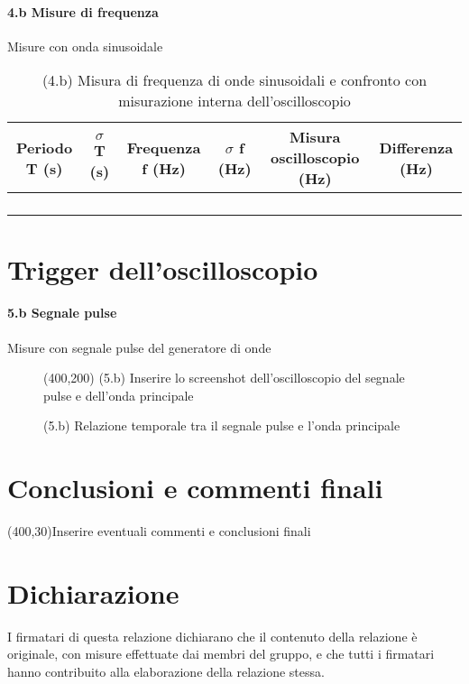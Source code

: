 \documentclass[10pt,a4paper]{article}
\newcommand{\exn}{\phantom{xxx}}
\begin{document}
\paragraph{4.b Misure di frequenza}
Misure con onda sinusoidale
\begin{table}[h]
\centering
\begin{tabular}{|c|c|c|c|c|c|}
\hline 
Periodo T (s)& $\sigma$ T (s)  &Frequenza f (Hz) & $\sigma$ f (Hz) & Misura oscilloscopio (Hz) & Differenza (Hz)\\
\hline 
\exn & \exn & \exn & \exn & \exn &\exn \\
\exn & \exn & \exn & \exn & \exn &\exn \\
\exn & \exn & \exn & \exn & \exn &\exn \\
\exn & \exn & \exn & \exn & \exn &\exn \\
\hline 
\end{tabular} 
\caption{(4.b) Misura di frequenza di onde sinusoidali  e confronto con misurazione interna dell'oscilloscopio }
\end{table}



\section{Trigger dell'oscilloscopio}
\paragraph{5.b Segnale pulse}
Misure con segnale pulse del generatore di onde
\begin{figure}[h]
\centering
\framebox(400,200){ (5.b) Inserire lo screenshot dell'oscilloscopio del segnale pulse e dell'onda principale  }
\caption{(5.b) Relazione temporale tra il segnale pulse e l'onda principale}
\end{figure}


\section{Conclusioni e commenti finali}
\framebox(400,30){Inserire eventuali commenti e conclusioni finali}

\section*{Dichiarazione}
I firmatari di questa relazione dichiarano che il contenuto della relazione \`e originale, con misure effettuate dai membri del gruppo, e che tutti i firmatari hanno contribuito alla elaborazione della relazione stessa.
\end{document}
